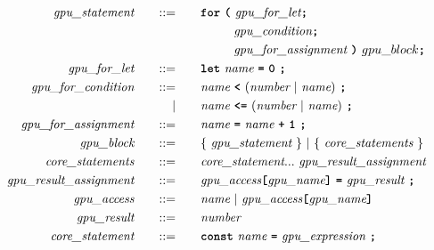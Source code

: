 \begin{alignat*}{9}
    && \textit{gpu\_statement} 
    &&\quad ::= &\quad 
    && \textbf{\texttt{for}}\ \textbf{\texttt{(}} 
                              \ \textit{gpu\_for\_let} \textbf{\texttt{;}} \\
    &&  &&     &\quad && \ \ \ \ \ \ \ \  \textit{gpu\_condition} \textbf{\texttt{;}} \\
    &&  &&     &\quad && \ \ \ \ \ \ \ \  \textit{gpu\_for\_assignment} \ \textbf{\texttt{)}}  \ gpu\_block \textbf{\texttt{;}} \\
    && \textit{gpu\_for\_let} 
    &&\quad ::= &\quad 
    && \textbf{\texttt{let}}\  \textit{name} \ 
                                               \textbf{\texttt{=}}\  \textbf{\texttt{0}} \ \textbf{\texttt{;}} \\
    && \textit{gpu\_for\_condition} 
    &&\quad ::= &\quad 
    && \textit{name} \ 
    \textbf{\texttt{<}}\  (\textit{number} \ | \ \textit{name})\ \textbf{\texttt{;}} \\
    &&  && |    &\quad && \textit{name} \ \textbf{\texttt{<=}}\  (\textit{number} \ | \ \textit{name})\ \textbf{\texttt{;}} \\
    && \textit{gpu\_for\_assignment} 
    &&\quad ::= &\quad 
    && \textit{name} \ \textbf{\texttt{=}}\  \textit{name} \  \textbf{\texttt{+}} \ \textbf{\texttt{1}} \  \textbf{\texttt{;}} \\
    && \textit{gpu\_block} 
    &&\quad ::= &\quad 
    && \{ \ \textit{gpu\_statement} \ \} \ | \ \{ \ \textit{core\_statements} \ \} \\
    && \textit{core\_statements} 
    &&\quad ::= &\quad 
    && \textit{core\_statement} {...} \ \textit{gpu\_result\_assignment} \\
    && \textit{gpu\_result\_assignment} 
    &&\quad ::= &\quad 
    && \textit{gpu\_access} \textbf{\texttt{[}} \textit{gpu\_name} \textbf{\texttt{]}}\ \textbf{\texttt{=}}\  \textit{gpu\_result} \ \textbf{\texttt{;}} \\
    && \textit{gpu\_access} 
    &&\quad ::= &\quad && \textit{name} \ | \
    \textit{gpu\_access} \textbf{\texttt{[}} \textit{gpu\_name} \textbf{\texttt{]}}\ \\
    && \textit{gpu\_result} 
    &&\quad ::= &\quad && \textit{number} \\
    && \textit{core\_statement} 
    &&\quad ::= &\quad 
    && \textbf{\texttt{const}}\  \textit{name} \ 
        \textbf{\texttt{=}}\  \textit{gpu\_expression} \ \textbf{\texttt{;}} \\

\end{alignat*}
